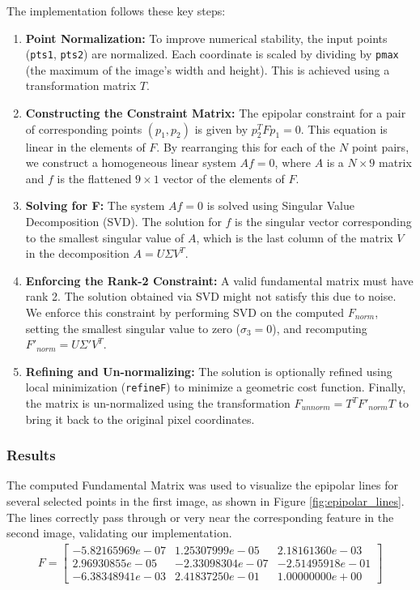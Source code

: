 \documentclass{article}
\begin{document}
The implementation follows these key steps:
\begin{enumerate}
    \item \textbf{Point Normalization:} To improve numerical stability, the input points (\texttt{pts1}, \texttt{pts2}) are normalized. Each coordinate is scaled by dividing by \texttt{pmax} (the maximum of the image's width and height). This is achieved using a transformation matrix $T$.
    \item \textbf{Constructing the Constraint Matrix:} The epipolar constraint for a pair of corresponding points $(p_1, p_2)$ is given by $p_2^T F p_1 = 0$. This equation is linear in the elements of $F$. By rearranging this for each of the $N$ point pairs, we construct a homogeneous linear system $Af=0$, where $A$ is a $N \times 9$ matrix and $f$ is the flattened $9 \times 1$ vector of the elements of $F$.
    \item \textbf{Solving for F:} The system $Af=0$ is solved using Singular Value Decomposition (SVD). The solution for $f$ is the singular vector corresponding to the smallest singular value of $A$, which is the last column of the matrix $V$ in the decomposition $A=U\Sigma V^T$.
    \item \textbf{Enforcing the Rank-2 Constraint:} A valid fundamental matrix must have rank 2. The solution obtained via SVD might not satisfy this due to noise. We enforce this constraint by performing SVD on the computed $F_{norm}$, setting the smallest singular value to zero ($\sigma_3=0$), and recomputing $F'_{norm} = U\Sigma'V^T$.
    \item \textbf{Refining and Un-normalizing:} The solution is optionally refined using local minimization (\texttt{refineF}) to minimize a geometric cost function. Finally, the matrix is un-normalized using the transformation $F_{unnorm} = T^T F'_{norm} T$ to bring it back to the original pixel coordinates.
\end{enumerate}

\subsubsection{Results}
The computed Fundamental Matrix was used to visualize the epipolar lines for several selected points in the first image, as shown in Figure \ref{fig:epipolar_lines}. The lines correctly pass through or very near the corresponding feature in the second image, validating our implementation.\newline
\begin{multline}
F = \begin{bmatrix}
-5.82165969e-07 & 1.25307999e-05 & 2.18161360e-03 \\
2.96930855e-05 & -2.33098304e-07 & -2.51495918e-01 \\
-6.38348941e-03 & 2.41837250e-01 & 1.00000000e+00
\end{bmatrix}
\end{multline}
\end{document}
